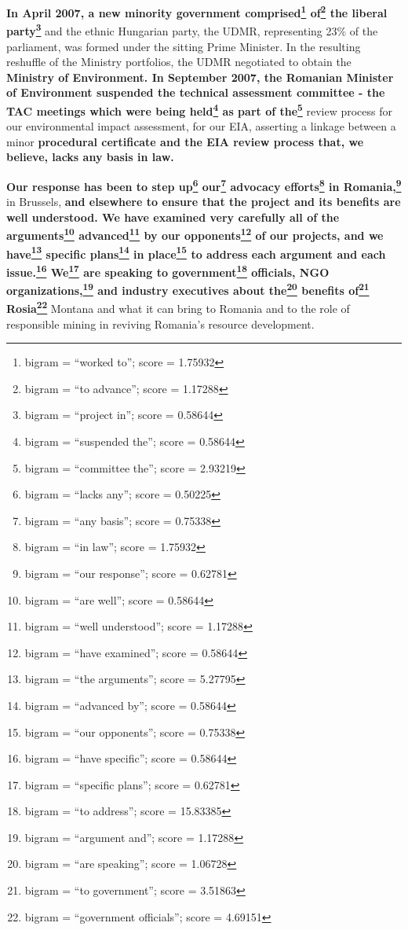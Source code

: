 \documentclass{article}
\begin{document}
 \textbf{In April 2007, a new minority government comprised\footnote{bigram = ``worked to''; score = 1.75932} of\footnote{bigram = ``to advance''; score = 1.17288} the liberal party\footnote{bigram = ``project in''; score = 0.58644}} and the ethnic Hungarian party, the UDMR, representing 23\% of the parliament, was formed under the sitting Prime Minister. In the resulting reshuffle of the Ministry portfolios, the UDMR negotiated to obtain the \textbf{Ministry of Environment. In September 2007, the Romanian Minister of Environment suspended the technical assessment committee - the TAC meetings which were being held\footnote{bigram = ``suspended the''; score = 0.58644} as part of the\footnote{bigram = ``committee the''; score = 2.93219}} review process for our environmental impact assessment, for our EIA, asserting a linkage between a minor \textbf{procedural certificate and the EIA review process that, we believe, lacks any basis in law.} 

 \textbf{Our response has been to step up\footnote{bigram = ``lacks any''; score = 0.50225} our\footnote{bigram = ``any basis''; score = 0.75338} advocacy efforts\footnote{bigram = ``in law''; score = 1.75932} in Romania,\footnote{bigram = ``our response''; score = 0.62781}} in Brussels, \textbf{and elsewhere to ensure that the project and its benefits are well understood. We have examined very carefully all of the arguments\footnote{bigram = ``are well''; score = 0.58644} advanced\footnote{bigram = ``well understood''; score = 1.17288} by our opponents\footnote{bigram = ``have examined''; score = 0.58644} of our projects, and we have\footnote{bigram = ``the arguments''; score = 5.27795} specific plans\footnote{bigram = ``advanced by''; score = 0.58644} in place\footnote{bigram = ``our opponents''; score = 0.75338} to address each argument and each issue.\footnote{bigram = ``have specific''; score = 0.58644} We\footnote{bigram = ``specific plans''; score = 0.62781} are speaking to government\footnote{bigram = ``to address''; score = 15.83385} officials, NGO organizations,\footnote{bigram = ``argument and''; score = 1.17288} and industry executives about the\footnote{bigram = ``are speaking''; score = 1.06728} benefits of\footnote{bigram = ``to government''; score = 3.51863} Rosia\footnote{bigram = ``government officials''; score = 4.69151}} Montana and what it can bring to Romania and to the role of responsible mining in reviving Romania's resource development. 
\end{document}
